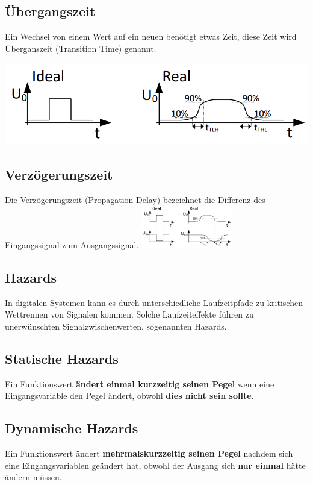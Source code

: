 \documentclass[10pt]{article}
\begin{document}
\begin{multicols}{2}
\subsection{Übergangszeit}
Ein Wechsel von einem Wert auf ein neuen benötigt etwas Zeit, diese Zeit wird Überganszeit (Transition Time) genannt.
\begin{center}
    \includegraphics[width=0.3 \textwidth]{TransitionTime.PNG}
\end{center}
\columnbreak
\subsection{Verzögerungszeit}
Die Verzögerungszeit (Propagation Delay) bezeichnet die Differenz des Eingangssignal zum Ausgangssignal.
\includegraphics[width=0.3\textwidth]{PropagationDelay.PNG}
\end{multicols}
\subsection{Hazards}
In digitalen Systemen kann es durch unterschiedliche Laufzeitpfade zu
kritischen Wettrennen von Signalen kommen. Solche Laufzeiteffekte führen zu unerwünschten Signalzwischenwerten, sogenannten Hazards.
\begin{multicols}{2}
\subsection{Statische Hazards}
Ein Funktionswert \textbf{ändert einmal kurzzeitig seinen Pegel} wenn eine Eingangsvariable den Pegel ändert, obwohl \textbf{dies nicht sein sollte}. 
\columnbreak
\subsection{Dynamische Hazards}
Ein Funktionswert ändert \textbf{mehrmalskurzzeitig seinen Pegel} nachdem sich eine Eingangsvariablen geändert hat, obwohl der Ausgang sich \textbf{nur einmal} hätte ändern müssen.
\end{multicols}
\end{document}
